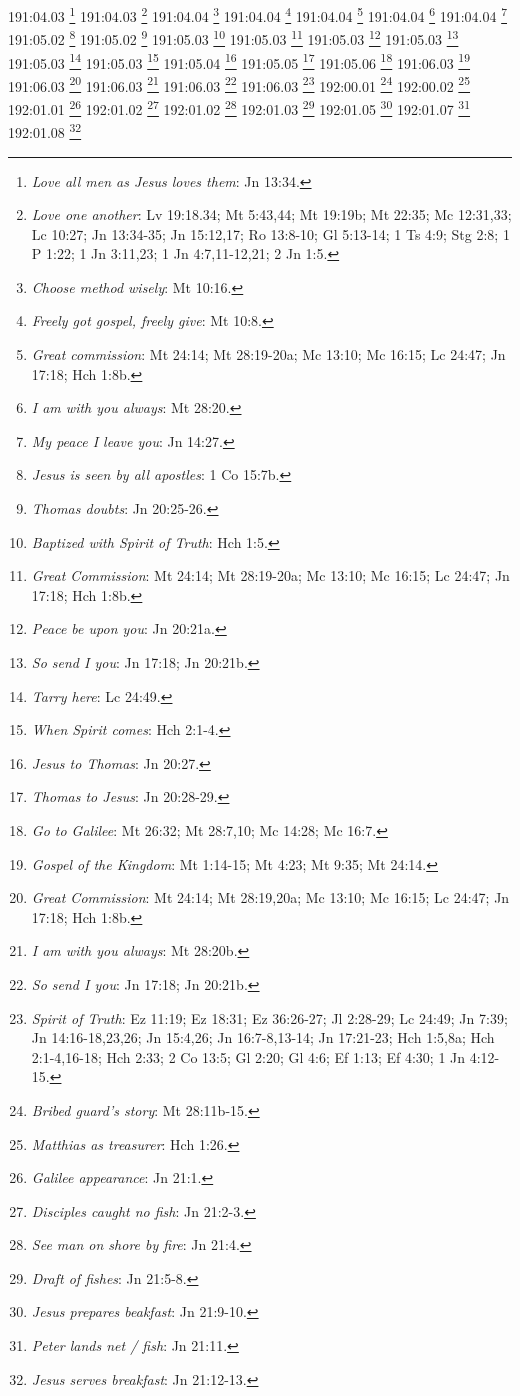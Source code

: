 191:04.03 \footnote{\textit{Love all men as Jesus loves them}: Jn 13:34.}
191:04.03 \footnote{\textit{Love one another}: Lv 19:18.34; Mt 5:43,44; Mt 19:19b; Mt 22:35; Mc 12:31,33; Lc 10:27; Jn 13:34-35; Jn 15:12,17; Ro 13:8-10; Gl 5:13-14; 1 Ts 4:9; Stg 2:8; 1 P 1:22; 1 Jn 3:11,23; 1 Jn 4:7,11-12,21; 2 Jn 1:5.}
191:04.04 \footnote{\textit{Choose method wisely}: Mt 10:16.}
191:04.04 \footnote{\textit{Freely got gospel, freely give}: Mt 10:8.}
191:04.04 \footnote{\textit{Great commission}: Mt 24:14; Mt 28:19-20a; Mc 13:10; Mc 16:15; Lc 24:47; Jn 17:18; Hch 1:8b.}
191:04.04 \footnote{\textit{I am with you always}: Mt 28:20.}
191:04.04 \footnote{\textit{My peace I leave you}: Jn 14:27.}
191:05.02 \footnote{\textit{Jesus is seen by all apostles}: 1 Co 15:7b.}
191:05.02 \footnote{\textit{Thomas doubts}: Jn 20:25-26.}
191:05.03 \footnote{\textit{Baptized with Spirit of Truth}: Hch 1:5.}
191:05.03 \footnote{\textit{Great Commission}: Mt 24:14; Mt 28:19-20a; Mc 13:10; Mc 16:15; Lc 24:47; Jn 17:18; Hch 1:8b.}
191:05.03 \footnote{\textit{Peace be upon you}: Jn 20:21a.}
191:05.03 \footnote{\textit{So send I you}: Jn 17:18; Jn 20:21b.}
191:05.03 \footnote{\textit{Tarry here}: Lc 24:49.}
191:05.03 \footnote{\textit{When Spirit comes}: Hch 2:1-4.}
191:05.04 \footnote{\textit{Jesus to Thomas}: Jn 20:27.}
191:05.05 \footnote{\textit{Thomas to Jesus}: Jn 20:28-29.}
191:05.06 \footnote{\textit{Go to Galilee}: Mt 26:32; Mt 28:7,10; Mc 14:28; Mc 16:7.}
191:06.03 \footnote{\textit{Gospel of the Kingdom}: Mt 1:14-15; Mt 4:23; Mt 9:35; Mt 24:14.}
191:06.03 \footnote{\textit{Great Commission}: Mt 24:14; Mt 28:19,20a; Mc 13:10; Mc 16:15; Lc 24:47; Jn 17:18; Hch 1:8b.}
191:06.03 \footnote{\textit{I am with you always}: Mt 28:20b.}
191:06.03 \footnote{\textit{So send I you}: Jn 17:18; Jn 20:21b.}
191:06.03 \footnote{\textit{Spirit of Truth}: Ez 11:19; Ez 18:31; Ez 36:26-27; Jl 2:28-29; Lc 24:49; Jn 7:39; Jn 14:16-18,23,26; Jn 15:4,26; Jn 16:7-8,13-14; Jn 17:21-23; Hch 1:5,8a; Hch 2:1-4,16-18; Hch 2:33; 2 Co 13:5; Gl 2:20; Gl 4:6; Ef 1:13; Ef 4:30; 1 Jn 4:12-15.}
192:00.01 \footnote{\textit{Bribed guard's story}: Mt 28:11b-15.}
192:00.02 \footnote{\textit{Matthias as treasurer}: Hch 1:26.}
192:01.01 \footnote{\textit{Galilee appearance}: Jn 21:1.}
192:01.02 \footnote{\textit{Disciples caught no fish}: Jn 21:2-3.}
192:01.02 \footnote{\textit{See man on shore by fire}: Jn 21:4.}
192:01.03 \footnote{\textit{Draft of fishes}: Jn 21:5-8.}
192:01.05 \footnote{\textit{Jesus prepares beakfast}: Jn 21:9-10.}
192:01.07 \footnote{\textit{Peter lands net / fish}: Jn 21:11.}
192:01.08 \footnote{\textit{Jesus serves breakfast}: Jn 21:12-13.}
